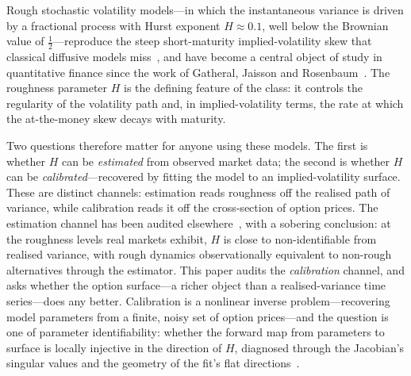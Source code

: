 \documentclass[11pt,a4paper]{article}
\numberwithin{equation}{section}
\begin{document}
Rough stochastic volatility models---in which the instantaneous variance is driven by a
fractional process with Hurst exponent $H\approx 0.1$, well below the Brownian value of
$\tfrac12$---reproduce the steep short-maturity implied-volatility skew that classical
diffusive models miss~\citep{bfg2016}, and have become a central object of study in quantitative finance
since the work of Gatheral, Jaisson and Rosenbaum~\citeyearpar{gjr2018}. The roughness parameter $H$ is the
defining feature of the class: it controls the regularity of the volatility path and, in
implied-volatility terms, the rate at which the at-the-money skew decays with maturity.

Two questions therefore matter for anyone using these models. The first is whether $H$ can
be \emph{estimated} from observed market data; the second is whether $H$ can be
\emph{calibrated}---recovered by fitting the model to an implied-volatility surface. These
are distinct channels: estimation reads roughness off the realised path of variance, while
calibration reads it off the cross-section of option prices. The estimation channel has been
audited elsewhere~\citep{lumor_identifiability}, with a sobering conclusion: at the roughness
levels real markets exhibit,
$H$ is close to non-identifiable from realised variance, with rough dynamics observationally
equivalent to non-rough alternatives through the estimator. This paper audits the
\emph{calibration} channel, and asks whether the option surface---a richer object than a
realised-variance time series---does any better. Calibration is a nonlinear inverse
problem---recovering model parameters from a finite, noisy set of option prices---and the
question is one of parameter identifiability: whether the forward map from parameters to
surface is locally injective in the direction of $H$, diagnosed through the Jacobian's
singular values and the geometry of the fit's flat directions~\citep{kaipio2005}.
\end{document}

